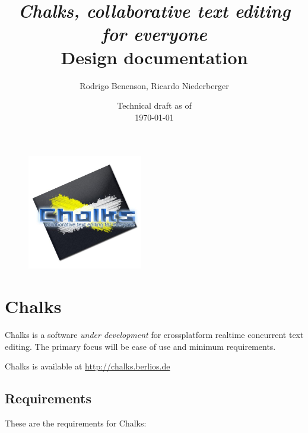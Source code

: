 \documentclass{report}
\title{\large \emph{Chalks, collaborative text editing for everyone} \\ \huge Design documentation}
\author{Rodrigo Benenson, Ricardo Niederberger}
\date{Technical draft as of\\ \today}
\begin{document}
\begin{figure}[!t]
 \begin{center}
    \includegraphics[angle=0,width=5cm]{schemas/logo.jpg}
 \end{center}
\end{figure}


\maketitle
\thispagestyle{empty}

\newpage
\setcounter{page}{1}


\tableofcontents
\newpage
% 

\chapter{Chalks}


Chalks is a software \emph{under development} for crossplatform realtime concurrent text editing.
The primary focus will be ease of use and minimum requirements.


Chalks is available at \url{http://chalks.berlios.de}


\section{Requirements}

These are the requirements for Chalks:
\end{document}
